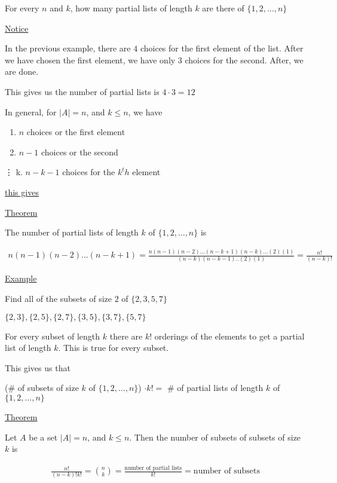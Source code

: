 \documentclass{article}
\begin{document}
For every $n$ and $k$, how many partial lists of length $k$ are there of $\{1,2,\ldots,n\}$

\underline{Notice}

In the previous example, there are $4$ choices for the first element of the list. After we have chosen the first element, we have only 3 choices for the second. After, we are done. 

This gives us the number of partial lists is $4 \cdot 3 = 12$

In general, for $|A| = n$, and $k \le n$, we have

\begin{enumerate}
    \item $n$ choices or the first element
    \item $n-1$ choices or the second
\end{enumerate}

\vdots
k. $n-k-1$ choices for the $k^th$ element

\underline{this gives}

\underline{Theorem}

The number of partial lists of length $k$ of $\{1,2,\ldots,n\}$ is 

\begin{align*}
n(n-1)(n-2)...(n-k+1)
= \frac{n(n-1)(n-2)...(n-k+1)(n-k)...(2)(1)}{(n-k)(n-k-1)..(2)(1)}
= \frac{n!}{(n-k)!}
\end{align*}

\underline{Example}

Find all of the subsets of size $2$ of $\{2,3,5,7\}$ 

$\{2,3\},\{2,5\},\{2,7\},\{3,5\},\{3,7\},\{5,7\}$

For every subset of length $k$ there are $k!$ orderings of the elements to get a partial list of length $k$. This is true for every subset.

This gives us that 

(\# of subsets of size $k$ of $\{1,2,\ldots,n\}$) $ \cdot k! =$ \# of partial lists of length $k$ of $\{1,2,\ldots,n\}$

\underline{Theorem}

Let $A$ be a set $|A| = n$, and $k \le n$. Then the number of subsets of subsets of size $k$ is

\begin{align*}
\frac{n!}{(n-k)!k!} = \binom{n}{k}
=\frac{\text{number of partial lists}}{k!}
=\text{number of subsets}
\end{align*}
\end{document}

